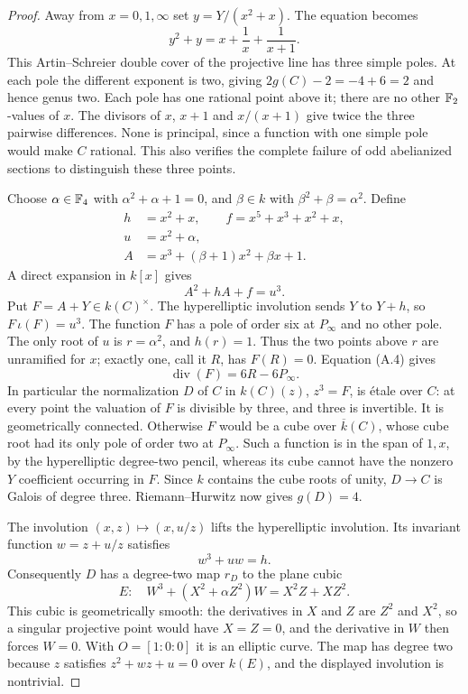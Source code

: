 \begin{proof}
Away from $x=0,1,\infty$ set $y=Y/(x^2+x)$. The equation becomes
\[
 y^2+y=x+\frac1x+\frac1{x+1}.
\]
This Artin--Schreier double cover of the projective line has three
simple poles. At each pole the different exponent is two, giving
$2g(C)-2=-4+6=2$ and hence genus two. Each pole has one rational
point above it; there are no other $\mathbb F_2$-values of $x$.
The divisors of $x$, $x+1$ and $x/(x+1)$ give twice the three
pairwise differences. None is principal, since a function with
one simple pole would make $C$ rational. This also verifies the
complete failure of odd abelianized sections to distinguish these
three points.

Choose $\alpha\in\mathbb F_4$ with $\alpha^2+\alpha+1=0$, and
$\beta\in k$ with $\beta^2+\beta=\alpha^2$. Define
\[
 \begin{split}
 h&=x^2+x,\qquad f=x^5+x^3+x^2+x,\\
 u&=x^2+\alpha,\\
 A&=x^3+(\beta+1)x^2+\beta x+1.
 \end{split}
\]
A direct expansion in $k[x]$ gives
\[
 A^2+hA+f=u^3.                                                     \tag{A.4}
\]
Put $F=A+Y\in k(C)^\times$. The hyperelliptic involution sends
$Y$ to $Y+h$, so $F\,\iota(F)=u^3$. The function $F$ has a
pole of order six at $P_\infty$ and no other pole.
The only root of $u$ is $r=\alpha^2$, and $h(r)=1$. Thus the
two points above $r$ are unramified for $x$; exactly one, call it
$R$, has $F(R)=0$. Equation (A.4) gives
\[
 \operatorname{div}(F)=6R-6P_\infty.
\]
In particular the normalization $D$ of $C$ in
$k(C)(z)$, $z^3=F$, is \'etale over $C$: at every point the
valuation of $F$ is divisible by three, and three is invertible.
It is geometrically connected. Otherwise $F$ would be a cube
over $\overline k(C)$, whose cube root had its only pole of order
two at $P_\infty$. Such a function is in the span of $1,x$, by
the hyperelliptic degree-two pencil, whereas its cube cannot have
the nonzero $Y$ coefficient occurring in $F$. Since $k$ contains
the cube roots of unity, $D\to C$ is Galois of degree three.
Riemann--Hurwitz now gives $g(D)=4$.

The involution $(x,z)\mapsto(x,u/z)$ lifts the hyperelliptic
involution. Its invariant function $w=z+u/z$ satisfies
\[
 w^3+u w=h.
\]
Consequently $D$ has a degree-two map $r_D$ to the plane cubic
\[
 E:\quad
 W^3+(X^2+\alpha Z^2)W=X^2Z+XZ^2.                                \tag{A.5}
\]
This cubic is geometrically smooth: the derivatives in $X$ and
$Z$ are $Z^2$ and $X^2$, so a singular projective point would
have $X=Z=0$, and the derivative in $W$ then forces $W=0$.
With $O=[1:0:0]$ it is an elliptic curve. The map has degree two
because $z$ satisfies $z^2+wz+u=0$ over $k(E)$, and the displayed
involution is nontrivial.


\end{proof}
